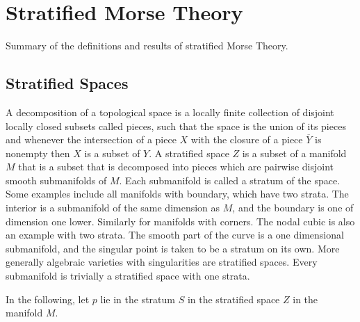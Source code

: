 
\chapter{Stratified Morse Theory}
\label{chp:Stratified Morse Theory}

Summary of the definitions and results of stratified Morse Theory.

\section{Stratified Spaces}
\label{sec:Stratified Spaces}
A decomposition of a topological space is a locally finite collection of disjoint locally closed subsets called pieces, such that the space is the union of its pieces and whenever the intersection of a piece $X$ with the closure of a piece $\overline{Y}$ is nonempty then $X$ is a subset of $Y$. A stratified space $Z$ is a subset of a manifold $M$ that is a subset that is decomposed into pieces which are pairwise disjoint smooth submanifolds of $M$. Each submanifold is called a stratum of the space. Some examples include all manifolds with boundary, which have two strata. The interior is a submanifold of the same dimension as $M$, and the boundary is one of dimension one lower. Similarly for manifolds with corners. The nodal cubic is also an example with two strata. The smooth part of the curve is a one dimensional submanifold, and the singular point is taken to be a stratum on its own. More generally algebraic varieties with singularities are stratified spaces. Every submanifold is trivially a stratified space with one strata.

In the following, let $p$ lie in the stratum $S$ in the stratified space $Z$ in the manifold $M$.

